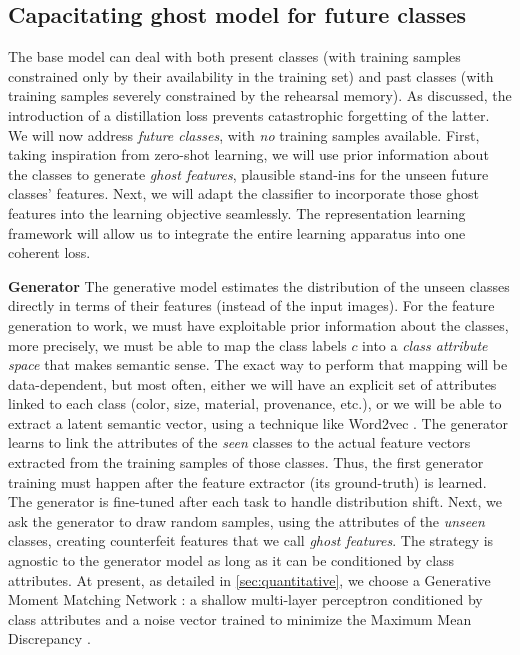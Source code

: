 \subsection{Capacitating ghost model for future classes}

The base model can deal with both present classes (with training samples constrained only by their
availability in the training set)  and past classes (with training samples severely constrained by
the rehearsal memory). As discussed, the introduction of a distillation loss prevents catastrophic
forgetting of the latter. We will now address \textit{future classes}, with \textit{no} training
samples available. First, taking inspiration from zero-shot learning, we will use prior information
about the classes to generate \textit{ghost features}, plausible stand-ins for the unseen future
classes' features. Next, we will adapt the classifier to incorporate those ghost features into the
learning objective seamlessly. The representation learning framework will allow us to integrate the
entire learning apparatus into one coherent loss.

\textbf{Generator} The generative model estimates the distribution of the unseen classes directly
in terms of their features (instead of the input images). For the feature generation to work, we
must have exploitable prior information about the classes, more precisely, we must be able to map
the class labels $c$ into a \textit{class attribute space} that makes semantic sense. The exact way
to perform that mapping will be data-dependent, but most often, either we will have an explicit set
of attributes linked to each class (color, size, material, provenance, etc.), or we will be able to
extract a latent semantic vector, using a technique like Word2vec
\cite{mikolov2013word2vec,pennington2014glove}. The generator learns to link the attributes of the
\textit{seen} classes to the actual feature vectors extracted from the training samples of those
classes. Thus, the first generator training must happen after the feature extractor (its
ground-truth) is learned. The generator is fine-tuned after each task to handle distribution shift.
Next, we ask the generator to draw random samples, using the attributes of the \textit{unseen}
classes, creating counterfeit features that we call \textit{ghost features}. The strategy is
agnostic to the generator model as long as it can be conditioned by class attributes.  At present,
as detailed in \autoref{sec:quantitative}, we choose a Generative Moment Matching Network
\cite{li2015gmmn}: a shallow multi-layer perceptron conditioned by class attributes and a noise
vector trained to minimize the Maximum Mean Discrepancy
\cite{gretton2007twosampleMMD,gretton2012twosampletestMMD}.

